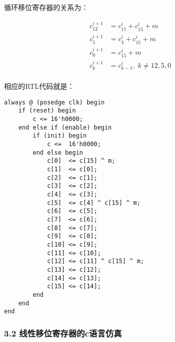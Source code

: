 \documentclass[
]{article}
\begin{document}
循环移位寄存器的关系为：

\begin{equation}
\begin{aligned}
c_{12}^{i+1}&=c_{11}^{i}+c_{15}^i+m\\
c_{ 5}^{i+1}&=c_{ 4}^{i}+c_{15}^i+m\\
c_{ 0}^{i+1}&=c_{15}^i+m\\
c_{ k}^{i+1}&=c_{ k-1}^{i},\; k \neq 12,5,0 \\
\end{aligned}
\end{equation}

相应的RTL代码就是：


\begin{lstlisting}[style={verilog-style}]
always @ (posedge clk) begin
    if (reset) begin
        c <= 16'h0000;
    end else if (enable) begin
        if (init) begin
            c <=  16'h0000;
        end else begin
            c[0]  <= c[15] ^ m;
            c[1]  <= c[0];
            c[2]  <= c[1];
            c[3]  <= c[2];
            c[4]  <= c[3];
            c[5]  <= c[4] ^ c[15] ^ m;
            c[6]  <= c[5];
            c[7]  <= c[6];
            c[8]  <= c[7];
            c[9]  <= c[8];
            c[10] <= c[9];
            c[11] <= c[10];
            c[12] <= c[11] ^ c[15] ^ m;
            c[13] <= c[12];
            c[14] <= c[13];
            c[15] <= c[14];
        end
    end
end
\end{lstlisting}

\hypertarget{header-n163}{%
\subsubsection{3.2 线性移位寄存器的c语言仿真}\label{header-n163}}
\end{document}
